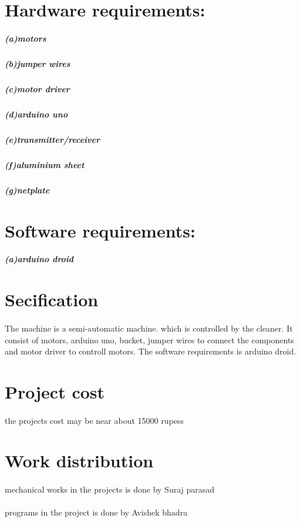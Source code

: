 \documentclass[]{article}
\begin{document}
\section{Hardware requirements:}
\subparagraph{(a)motors}
\subparagraph{(b)jumper wires}
\subparagraph{(c)motor driver}
\subparagraph{(d)arduino uno}
\subparagraph{(e)transmitter/receiver}
\subparagraph{(f)aluminium sheet}
\subparagraph{(g)netplate}

\section{Software requirements:}
\subparagraph{(a)arduino droid}
\subparagraph{}
\paragraph{}

\section{Secification}
\paragraph{}
The machine is a semi-automatic machine. which is controlled by the cleaner. It consist of motors, arduino uno, bucket, jumper wires to connect the components and motor driver to controll motors. The software requirements is arduino droid.

\section{Project cost}
\paragraph{}
the projects cost may be near about 15000 rupess 
 
\section{Work distribution}
\paragraph{}
mechanical works in the projects is done by Suraj parasad
\paragraph{}
programs in the project is done by Avishek bhadra
\end{document}
